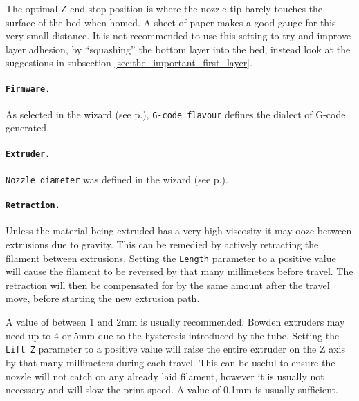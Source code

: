 The optimal Z end stop position is where the nozzle tip barely touches the surface of the bed when homed.  A sheet of paper makes a good gauge for this very small distance.  It is not recommended to use this setting to try and improve layer adhesion, by ``squashing'' the bottom layer into the bed, instead look at the suggestions in subsection \ref{sec:the_important_first_layer}.

\paragraph{\texttt{Firmware.}} %
\label{par:firmware}
As selected in the wizard (see p.\pageref{sub:1_firmware_type}), \texttt{G-code flavour} defines the dialect of G-code generated.


\paragraph{\texttt{Extruder.}} %
\label{par:extruder}
\texttt{Nozzle diameter} was defined in the wizard (see p.\pageref{sub:3_nozzle_diameter}).

\paragraph{\texttt{Retraction.}} %
\label{par:retraction}
Unless the material being extruded has a very high viscosity it may ooze between extrusions due to gravity.  This can be remedied by actively retracting the filament between extrusions.  Setting the \texttt{Length} parameter to a positive value will cause the filament to be reversed by that many millimeters before travel.  The retraction will then be compensated for by the same amount after the travel move, before starting the new extrusion path.

A value of between 1 and 2mm is usually recommended. Bowden extruders may need up to 4 or 5mm due to the hysteresis introduced by the tube.
Setting the \texttt{Lift Z} parameter to a positive value will raise the entire extruder on the Z axis by that many millimeters during each travel.  This can be useful to ensure the nozzle will not catch on any already laid filament, however it is usually not necessary and will slow the print speed.  A value of 0.1mm is usually sufficient.

